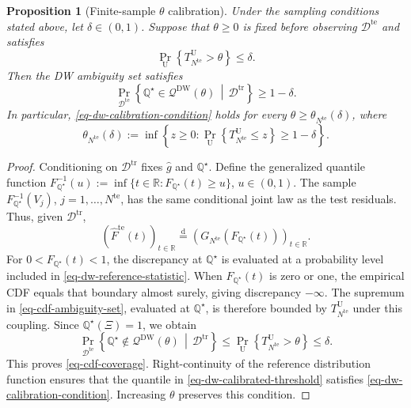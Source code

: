 \documentclass[review,11pt,3p,authoryear,nopreprintline]{elsarticle}
\newtheorem{proposition}{Proposition}
\begin{document}
\begin{proposition}[Finite-sample $\theta$ calibration]
  \label{proposition-01}
  Under the sampling conditions stated above, let $\delta\in(0,1)$. Suppose that $\theta\ge0$ is fixed before observing $\mathcal D^{\mathrm{te}}$ and satisfies
  \begin{equation}
    \Pr_{\mathrm U}\left\{T_{N^{\mathrm{te}}}^{\mathrm U}>\theta\right\}\le\delta.
    \label{eq-dw-calibration-condition}
  \end{equation}
  Then the DW ambiguity set satisfies
  \begin{equation}
    \Pr_{\mathcal D^{\mathrm{te}}}\left\{\mathbb Q^\star\in\mathscr Q^{\mathrm{DW}}(\theta)\,\middle|\,\mathcal D^{\mathrm{tr}}\right\}\ge1-\delta.
    \label{eq-cdf-coverage}
  \end{equation}
  In particular, \eqref{eq-dw-calibration-condition} holds for every $\theta\ge\theta_{N^{\mathrm{te}}}(\delta)$, where
  \begin{equation}
    \theta_{N^{\mathrm{te}}}(\delta):=\inf\left\{z\ge0:\Pr_{\mathrm U}\left\{T_{N^{\mathrm{te}}}^{\mathrm U}\le z\right\}\ge1-\delta\right\}.
    \label{eq-dw-calibrated-threshold}
  \end{equation}
\end{proposition}
\begin{proof}
  Conditioning on $\mathcal D^{\mathrm{tr}}$ fixes $\hat g$ and $\mathbb Q^\star$. Define the generalized quantile function $F_{\mathbb Q^\star}^{-1}(u):=\inf\{t\in\mathbb R:F_{\mathbb Q^\star}(t)\ge u\}$, $u\in(0,1)$. The sample $F_{\mathbb Q^\star}^{-1}(V_j)$, $j=1,\ldots,N^{\mathrm{te}}$, has the same conditional joint law as the test residuals. Thus, given $\mathcal D^{\mathrm{tr}}$,
  \[
    \left(\widehat F^{\mathrm{te}}(t)\right)_{t\in\mathbb R}\overset{\mathrm d}{=}\left(G_{N^{\mathrm{te}}}\!\left(F_{\mathbb Q^\star}(t)\right)\right)_{t\in\mathbb R}.
  \]
  For $0<F_{\mathbb Q^\star}(t)<1$, the discrepancy at $\mathbb Q^\star$ is evaluated at a probability level included in \eqref{eq-dw-reference-statistic}. When $F_{\mathbb Q^\star}(t)$ is zero or one, the empirical CDF equals that boundary almost surely, giving discrepancy $-\infty$. The supremum in \eqref{eq-cdf-ambiguity-set}, evaluated at $\mathbb Q^\star$, is therefore bounded by $T_{N^{\mathrm{te}}}^{\mathrm U}$ under this coupling. Since $\mathbb Q^\star(\Xi)=1$, we obtain
  \[
    \Pr_{\mathcal D^{\mathrm{te}}}\left\{\mathbb Q^\star\notin\mathscr Q^{\mathrm{DW}}(\theta)\,\middle|\,\mathcal D^{\mathrm{tr}}\right\}
    \le\Pr_{\mathrm U}\left\{T_{N^{\mathrm{te}}}^{\mathrm U}>\theta\right\}\le\delta.
  \]
  This proves \eqref{eq-cdf-coverage}. Right-continuity of the reference distribution function ensures that the quantile in \eqref{eq-dw-calibrated-threshold} satisfies \eqref{eq-dw-calibration-condition}. Increasing $\theta$ preserves this condition.
\end{proof}
\end{document}
